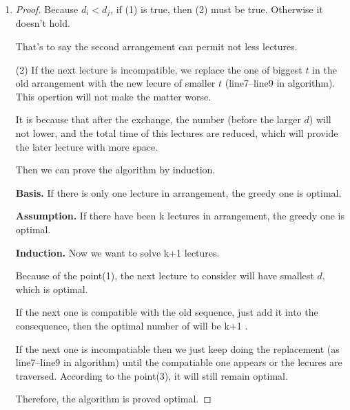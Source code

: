\documentclass[12pt,a4paper]{article}
\makeatletter
\newtheorem*{solution}{Solution}
\theoremstyle{definition}
\renewenvironment{solution}[1][Solution] {\par\pushQED{\qed}\normalfont\topsep6\p@\@plus6\p@\relax\trivlist\item[\hskip\labelsep\bfseries#1\@addpunct{.}]\ignorespaces}{\popQED\endtrivlist\@endpefalse} \makeatother
\makeatother
\begin{document}
\begin{enumerate}
\begin{solution}
\begin{proof}
    	Because $d_i<d_j$, if (1) is true, then (2) must be true. Otherwise it doesn't hold.
    	
    	That's to say the second arrangement can permit not less lectures.
    	
    	(2) If the next lecture is incompatible, we replace the one of biggest $t$ in the old arrangement with the new lecure of smaller $t$ (line7--line9 in algorithm). This opertion will not make the matter worse.
         
        It is because that after the exchange, the number (before the larger $d$)  will not lower, and the total time of this lectures are reduced, which will provide the later lecture with more space.
        
        Then we can prove the algorithm by induction.
        
       \textbf{Basis.}  If there is only one lecture in arrangement, the greedy one is optimal.
        
        \textbf{Assumption.}  If there have been k lectures in arrangement, the greedy one is optimal.
        
       \textbf{Induction.} Now we want to solve k+1 lectures. 
       
       Because of the point(1),  the next lecture to consider will have smallest $d$, which is optimal.
        
        If the next one is compatible with the old sequence, just add it into the consequence, then the optimal number of will be k+1 .
        
        If the next one is incompatiable then we just keep doing  the replacement (as line7--line9 in algorithm) until the compatiable one appears or the lecures are traversed. According to the point(3), it will still remain optimal.
        
        Therefore, the algorithm is proved optimal. 
        
        
    	
    	
    	
    	
    	
    	

\end{proof}
\end{solution}
\end{enumerate}
\end{document}
